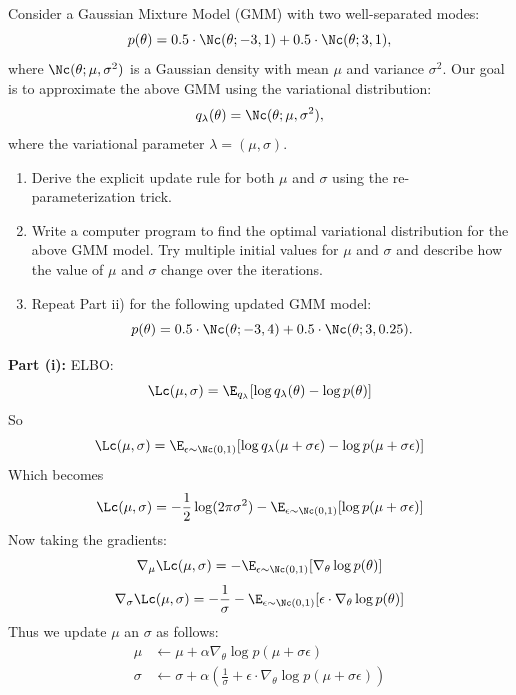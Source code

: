 \documentclass{article}
\begin{document}
\MakeAssignmentTitle

\begin{homeworkProblem}

  Consider a Gaussian Mixture Model (GMM) with two well-separated modes:
  \[
    p(\theta) = 0.5 \cdot \Nc(\theta;-3, 1) + 0.5 \cdot \Nc(\theta;3, 1),
  \]
  where $\Nc(\theta;\mu,\sigma^2)$ is a Gaussian density with mean $\mu$ and variance $\sigma^2$. Our goal is to approximate the above GMM using the variational
  distribution:
  \[
    q_\lambda(\theta) = \Nc(\theta; \mu, \sigma^2),
  \]
  where the variational parameter $\lambda = (\mu, \sigma)$.
  \begin{enumerate}[label=\roman*), topsep=5pt, itemsep=5pt]
    \item Derive the explicit update rule for both $\mu$ and $\sigma$ using the re-parameterization trick.
    \item Write a computer program to find the optimal variational distribution for the
          above GMM model. Try multiple initial values for $\mu$ and $\sigma$ and describe how the value of
          $\mu$ and $\sigma$ change over the iterations.
    \item Repeat Part ii) for the following updated GMM model:
          \[
            p(\theta) = 0.5 \cdot \Nc(\theta;-3, 4) + 0.5 \cdot \Nc(\theta;3, 0.25).
          \]
  \end{enumerate}

  \solution

  \textbf{Part (i):} ELBO:
  \[
    \Lc(\mu, \sigma) = \E_{q_{\lambda}} [\log q_\lambda(\theta) - \log p (\theta)]
  \]
  So
  \[
    \Lc(\mu, \sigma) = \E_{\epsilon \sim \Nc(0, 1)} [\log q_\lambda(\mu + \sigma \epsilon) - \log p (\mu + \sigma \epsilon)]
  \]
  Which becomes
  \[
    \Lc(\mu, \sigma) = - \frac{1}{2} \log (2\pi \sigma^2) - \E_{\epsilon \sim \Nc(0, 1)} [\log p (\mu + \sigma \epsilon)]
  \]
  Now taking the gradients:
  \[
    \nabla_\mu \Lc(\mu, \sigma) = - \E_{\epsilon \sim \Nc(0, 1)} [\nabla_\theta \log p (\theta)]
  \]
  \[
    \nabla_\sigma \Lc(\mu, \sigma) = - \frac{1}{\sigma} - \E_{\epsilon \sim \Nc(0, 1)} [\epsilon \cdot \nabla_\theta \log p (\theta)]
  \]
  Thus we update $\mu$ an $\sigma$ as follows:
  \begin{align*}
    \mu    & \leftarrow \mu + \alpha \nabla_\theta \log p (\mu + \sigma \epsilon)                                                     \\
    \sigma & \leftarrow \sigma + \alpha \left( \frac{1}{\sigma} + \epsilon \cdot \nabla_\theta \log p (\mu + \sigma \epsilon) \right)
  \end{align*}


\end{homeworkProblem}
\end{document}
